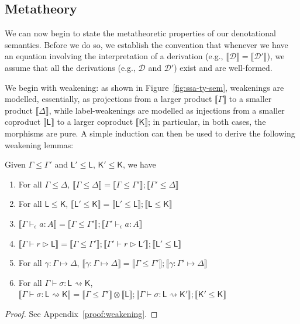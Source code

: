 \documentclass[acmsmall,screen,review]{acmart}
\newcommand{\mc}[1]{\ensuremath{\mathcal{#1}}}
\newcommand{\ms}[1]{\ensuremath{\mathsf{#1}}}
\newcommand{\hasty}[4]{#1 \vdash_{#2} #3: {#4}}
\newcommand{\haslb}[3]{#1 \vdash #2 \rhd #3}
\newcommand{\issubst}[3]{#1: #2 \mapsto #3}
\newcommand{\lbsubst}[4]{#1 \vdash #2: #3 \rightsquigarrow #4}
\newcommand{\dnt}[1]{\llbracket{#1}\rrbracket}
\begin{document}
\subsection{Metatheory}

We can now begin to state the metatheoretic properties of our denotational semantics. Before we do so, we establish the convention that whenever we have an equation involving the interpretation of a derivation (e.g., $\dnt{\mathcal{D}} = \dnt{\mc{D}'}$), we assume that all the derivations (e.g., $\mc{D}$ and $\mc{D}'$) exist and are well-formed. 

We begin with
weakening: as shown in Figure~\ref{fig:ssa-ty-sem}, weakenings are modelled, essentially, as
projections from a larger product $\dnt{\Gamma}$ to a smaller product $\dnt{\Delta}$, while
label-weakenings are modelled as injections from a smaller coproduct $\dnt{\ms{L}}$ to a larger
coproduct $\dnt{\ms{K}}$; in particular, in both cases, the morphisms are pure.  A simple induction
can then be used to derive the following weakening lemmas:
\begin{lemma}[name=(Label) Weakening, restate=weakeninglem]
  Given $\Gamma \leq \Gamma'$ and $\ms{L}' \leq \ms{L}$, $\ms{K}' \leq \ms{K}$, we have
  \begin{enumerate}[label=(\alph*)]
    \item For all $\Gamma \leq \Delta$, $\dnt{\Gamma \leq \Delta} = \dnt{\Gamma \leq
    \Gamma'};\dnt{\Gamma' \leq \Delta}$
      \label{itm:varwk}
    \item For all $\ms{L} \leq \ms{K}$, $\dnt{\ms{L}' \leq \ms{K}} = \dnt{\ms{L}' \leq
    \ms{L}};\dnt{\ms{L} \leq \ms{K}}$
      \label{itm:lbwk}
    \item $\dnt{\hasty{\Gamma}{\epsilon}{a}{A}} 
      = \dnt{\Gamma \leq \Gamma'};\dnt{\hasty{\Gamma'}{\epsilon}{a}{A}}$
      \label{itm:expwk}
    \item $\dnt{\haslb{\Gamma}{r}{\ms{L}}}
      = \dnt{\Gamma \leq \Gamma'}
      ; \dnt{\haslb{\Gamma'}{r}{\ms{L}'}}
      ; \dnt{\ms{L}' \leq \ms{L}}$
      \label{itm:regwk}
    \item For all $\issubst{\gamma}{\Gamma}{\Delta}$, $\dnt{\issubst{\gamma}{\Gamma}{\Delta}} =
      \dnt{\Gamma \leq \Gamma'};\dnt{\issubst{\gamma}{\Gamma'}{\Delta}}$
      \label{itm:substwk}
    \item For all $\lbsubst{\Gamma}{\sigma}{\ms{L}}{\ms{K}}$, $\dnt{\lbsubst{\Gamma}{\sigma}{\ms{L}}{\ms{K}}}
      = \dnt{\Gamma \leq \Gamma'} \otimes \dnt{\ms{L}}
      ; \dnt{\lbsubst{\Gamma}{\sigma}{\ms{L}}{\ms{K}'}}
      ; \dnt{\ms{K}' \leq \ms{K}}
      $
      \label{itm:lbsubstwk}
  \end{enumerate}
  \label{lem:wk}
\end{lemma}
\begin{proof}
  See Appendix~\ref{proof:weakening}.
\end{proof}
\end{document}
